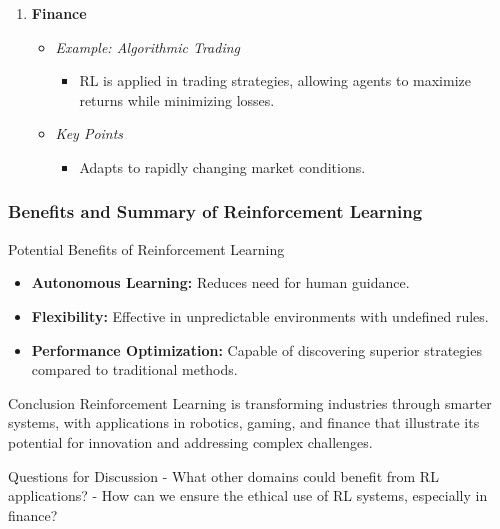\documentclass[aspectratio=169]{beamer}
\begin{document}
\begin{frame}[fragile]
\begin{enumerate}
        \item \textbf{Finance}
        \begin{itemize}
            \item \textit{Example: Algorithmic Trading}
            \begin{itemize}
                \item RL is applied in trading strategies, allowing agents to maximize returns while minimizing losses.
            \end{itemize}
            \item \textit{Key Points}
            \begin{itemize}
                \item Adapts to rapidly changing market conditions.
            \end{itemize}
        \end{itemize}
    \end{enumerate}
\end{frame}

\begin{frame}[fragile]
    \frametitle{Benefits and Summary of Reinforcement Learning}
    \begin{block}{Potential Benefits of Reinforcement Learning}
        \begin{itemize}
            \item \textbf{Autonomous Learning:} Reduces need for human guidance.
            \item \textbf{Flexibility:} Effective in unpredictable environments with undefined rules.
            \item \textbf{Performance Optimization:} Capable of discovering superior strategies compared to traditional methods.
        \end{itemize}
    \end{block}
    
    \begin{block}{Conclusion}
        Reinforcement Learning is transforming industries through smarter systems, with applications in robotics, gaming, and finance that illustrate its potential for innovation and addressing complex challenges.
    \end{block}
    
    \begin{block}{Questions for Discussion}
        - What other domains could benefit from RL applications?
        - How can we ensure the ethical use of RL systems, especially in finance?
    \end{block}
\end{frame}
\end{document}
